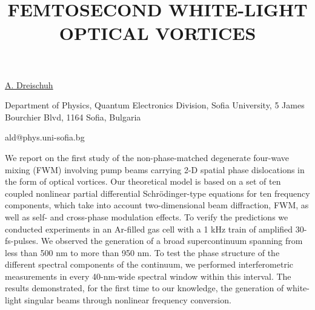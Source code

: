 \title{FEMTOSECOND WHITE-LIGHT OPTICAL VORTICES}

\underline{A. Dreischuh} 

\vspace{-4mm}
{\normalsize{Department of Physics, Quantum Electronics Division, Sofia University,
5 James Bourchier Blvd, 1164 Sofia, Bulgaria

\email ald@phys.uni-sofia.bg}}

We report on the first study of the non-phase-matched degenerate four-wave mixing (FWM) involving pump beams carrying 2-D spatial phase dislocations in the form of optical vortices. Our theoretical model is based on a set of ten coupled nonlinear partial differential Schr\"{o}dinger-type equations for ten frequency components, which take into account two-dimensional beam diffraction, FWM, as well as self- and cross-phase modulation effects. To verify the predictions we conducted experiments in an Ar-filled gas cell with a 1 kHz train of amplified 30-fs-pulses. We observed the generation of a broad supercontinuum spanning from less than 500 nm to more than 950 nm. To test the phase structure of the different spectral components of the continuum, we performed interferometric measurements in every 40-nm-wide spectral window within this interval. The results demonstrated, for the first time to our knowledge, the generation of white-light singular beams through nonlinear frequency conversion.

\vspace{\baselineskip} 